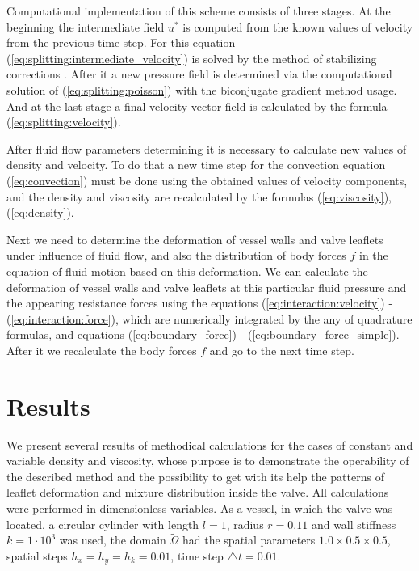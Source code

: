 \documentclass[runningheads,a4paper]{llncs}
\begin{document}
Computational implementation of this scheme consists of three stages. At the beginning the intermediate field $u^*$  is computed from the known values of velocity
from the previous time step. For this equation (\ref{eq:splitting:intermediate_velocity}) is solved by the method of stabilizing corrections \cite{yanenko}.
After it a new pressure field is determined via the computational solution of (\ref{eq:splitting:poisson}) with the biconjugate gradient method usage.
And at the last stage a final velocity vector field is calculated by the formula (\ref{eq:splitting:velocity}).

After fluid flow parameters determining it is necessary to calculate new values of density and velocity. To do that a new time step for the convection
equation (\ref{eq:convection}) must be done using the obtained values of velocity components, and the density and viscosity are recalculated
by the formulas (\ref{eq:viscosity}), (\ref{eq:density}).

Next we need to determine the deformation of vessel walls and valve leaflets under influence of fluid flow, and also the distribution of body forces $f$
in the equation of fluid motion based on this deformation. We can calculate the deformation of vessel walls and valve leaflets at this particular fluid pressure
and the appearing resistance forces using the equations (\ref{eq:interaction:velocity}) - (\ref{eq:interaction:force}), which are numerically integrated by
the any of quadrature formulas, and equations (\ref{eq:boundary_force}) - (\ref{eq:boundary_force_simple}). After it we recalculate the body forces $f$
and go to the next time step.

\section{Results}

We present several results of methodical calculations for the cases of constant and variable density and viscosity, whose purpose is to demonstrate the operability
of the described method and the possibility to get with its help the patterns of  leaflet deformation and mixture distribution inside the valve.
All calculations were performed in dimensionless variables. As a vessel, in which the valve was located, a circular cylinder with length $l = 1$,
radius $r = 0.11$ and wall stiffness $k = 1 \cdot 10^3$ was used, the domain $\tilde{\Omega}$ had the spatial parameters $1.0 \times 0.5 \times 0.5$,
spatial steps $h_x = h_y = h_k = 0.01$, time step $\triangle t = 0.01$.
\end{document}
